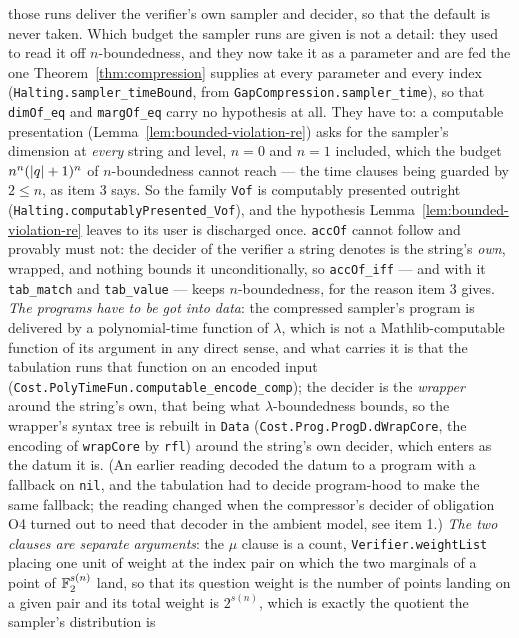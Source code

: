 \begin{remark}
those runs deliver the verifier's own sampler and decider, so that the default is never
taken. Which budget the sampler runs are given is not a detail: they used to read it off
$n$-boundedness, and they now take it as a parameter and are fed the one
Theorem~\ref{thm:compression} supplies at every parameter and every index
(\texttt{Halting.sampler\_timeBound}, from \texttt{GapCompression.sampler\_time}), so that
\texttt{dimOf\_eq} and \texttt{margOf\_eq} carry no hypothesis at all. They have to: a
computable presentation (Lemma~\ref{lem:bounded-violation-re}) asks for the sampler's
dimension at \emph{every} string and level, $n = 0$ and $n = 1$ included, which the budget
$n^n(\left\vert {q} \right\vert + 1)^n$ of $n$-boundedness cannot reach --- the time clauses being guarded by
$2 \leq n$, as item 3 says. So the family \texttt{Vof} is computably presented outright
(\texttt{Halting.computablyPresented\_Vof}), and the hypothesis
Lemma~\ref{lem:bounded-violation-re} leaves to its user is discharged once. \texttt{accOf}
cannot follow and provably must not: the decider of the verifier a string denotes is the
string's \emph{own}, wrapped, and nothing bounds it unconditionally, so \texttt{accOf\_iff}
--- and with it \texttt{tab\_match} and \texttt{tab\_value} --- keeps $n$-boundedness, for the
reason item 3 gives. \emph{The programs have to be got into data}: the compressed
sampler's program is delivered by a polynomial-time function of $\lambda$, which is not a
Mathlib-computable function of its argument in any direct sense, and what carries it is that
the tabulation runs that function on an encoded input
(\texttt{Cost.PolyTimeFun.computable\_encode\_comp}); the decider is the \emph{wrapper} around
the string's own, that being what $\lambda$-boundedness bounds, so the wrapper's syntax tree
is rebuilt in \texttt{Data} (\texttt{Cost.Prog.ProgD.dWrapCore}, the encoding of
\texttt{wrapCore} by \texttt{rfl}) around the string's own decider, which enters as the datum
it is. (An earlier reading decoded the datum to a program with a fallback on \texttt{nil}, and
the tabulation had to decide program-hood to make the same fallback; the reading changed when
the compressor's decider of obligation O4 turned out to need that decoder in the ambient model,
see item 1.) \emph{The two clauses
are separate arguments}: the $\mu$ clause is a count, \texttt{Verifier.weightList} placing one
unit of weight at the index pair on which the two marginals of a point of $\mathbb{F}_2^{s(n)}$ land,
so that its question weight is the number of points landing on a given pair and its total
weight is $2^{s(n)}$, which is exactly the quotient the sampler's distribution is

\end{remark}
